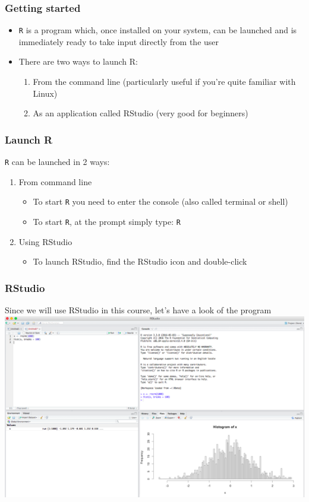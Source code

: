 \documentclass{beamer}
\begin{document}
\begin{frame}[fragile]
	\frametitle{Getting started}
        \begin{itemize}
          \item \texttt{R} is a program which, once installed on your system, can be launched and is immediately ready to take input directly from the user
          \item There are two ways to launch R:
            \begin{enumerate}
              \small
              \item From the command line (particularly useful if you're quite familiar with Linux)
              \item As an application called RStudio (very good for beginners)
            \end{enumerate}
        \end{itemize}
\end{frame}

\begin{frame}
	\frametitle{Launch R}
  \texttt{R} can be launched in 2 ways:
  \begin{enumerate}
    \item From command line
      \begin{itemize}
        \item To start \texttt{R} you need to enter the console (also called terminal or shell)
        \item To start \texttt{R}, at the prompt simply type: \Large \texttt{R}
      \end{itemize}
    \item Using RStudio
      \begin{itemize}
          \item To launch RStudio, find the RStudio icon and double-click
        \end{itemize}
  \end{enumerate}
\end{frame}

\begin{frame}
	\frametitle{RStudio}
	Since we will use RStudio in this course, let's have a look of the program\\
	\centering \includegraphics[scale=1.4]{figures/Rstudio_overview.png}
\end{frame}
\end{document}
